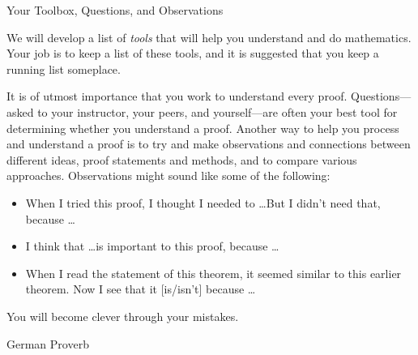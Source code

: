 \begin{section}{Your Toolbox, Questions, and Observations}

We will develop a list of \emph{tools} that will help you understand and do mathematics. Your job is to keep a list of these tools, and it is suggested that you keep a running list someplace.

It is of utmost importance that you work to understand every proof.  Questions---asked to your instructor, your peers, and yourself---are often your best tool for determining whether you understand a proof.  
Another way to help you process and understand a proof is to try and make observations and connections between different ideas, proof statements and methods, and to compare various approaches. Observations might sound like some of the following:
\begin{itemize}
\item When I tried this proof, I thought I needed to \ldots But I didn't need that, because \ldots
\item I think that \ldots is important to this proof, because \ldots
\item When I read the statement of this theorem, it seemed similar to this earlier theorem. Now I see that it [is/isn't] because \ldots
\end{itemize}

\epigraph{You will become clever through your mistakes.}{German Proverb}

\end{section}

